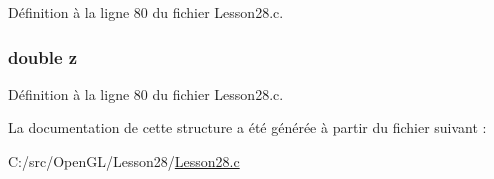 Définition à la ligne 80 du fichier Lesson28.\+c.

\hypertarget{structpoint__3d_ab3e6ed577a7c669c19de1f9c1b46c872}{}
\subsubsection[{z}]{\setlength{\rightskip}{0pt plus 5cm}double z}\label{structpoint__3d_ab3e6ed577a7c669c19de1f9c1b46c872}


Définition à la ligne 80 du fichier Lesson28.\+c.



La documentation de cette structure a été générée à partir du fichier suivant \+:\begin{DoxyCompactItemize}
\item 
C\+:/src/\+Open\+G\+L/\+Lesson28/\hyperlink{_lesson28_8c}{Lesson28.\+c}\end{DoxyCompactItemize}
